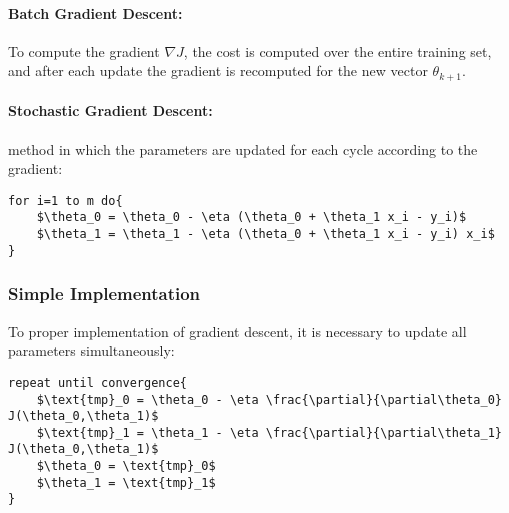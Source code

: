 \paragraph{Batch Gradient Descent:} To compute the gradient $\nabla J$, the cost is computed over the entire training set, and after each update the gradient is recomputed for the new vector $\theta_{k+1}$.
\paragraph{Stochastic Gradient Descent:} method in which the parameters are updated for each cycle according to the gradient:
\begin{lstlisting}[mathescape=true]
for i=1 to m do{
    $\theta_0 = \theta_0 - \eta (\theta_0 + \theta_1 x_i - y_i)$
    $\theta_1 = \theta_1 - \eta (\theta_0 + \theta_1 x_i - y_i) x_i$
}
\end{lstlisting}

\subsubsection{Simple Implementation}
To proper implementation of gradient descent, it is necessary to update all parameters simultaneously:
\begin{lstlisting}[mathescape=true]
repeat until convergence{
    $\text{tmp}_0 = \theta_0 - \eta \frac{\partial}{\partial\theta_0} J(\theta_0,\theta_1)$
    $\text{tmp}_1 = \theta_1 - \eta \frac{\partial}{\partial\theta_1} J(\theta_0,\theta_1)$
    $\theta_0 = \text{tmp}_0$
    $\theta_1 = \text{tmp}_1$
}
\end{lstlisting}
\newpage